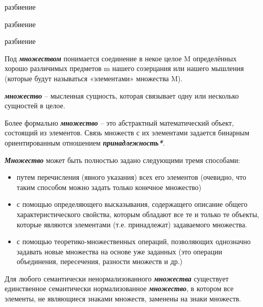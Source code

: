 \begin{SCn}
\begin{scnrelfromset}{разбиение}
\end{scnrelfromset}

\begin{scnrelfromset}{разбиение}
\end{scnrelfromset}

\begin{scnrelfromset}{разбиение}
\end{scnrelfromset}
\end{SCn}

Под \textbf{\textit{множеством}} понимается соединение в некое целое M определённых хорошо различимых предметов m нашего созерцания или нашего мышления (которые будут называться «элементами» множества M). 
	
\textbf{\textit{множество}} – мысленная сущность, которая связывает одну или несколько сущностей в целое.
	
Более формально \textbf{\textit{множество}} – это абстрактный математический объект, состоящий из элементов. Связь множеств с их элементами задается бинарным ориентированным отношением \textbf{\textit{принадлежность*}}.

\textbf{\textit{Множество}} может быть полностью задано следующими тремя способами:

\begin{itemize}
		\item путем перечисления (явного указания) всех его элементов (очевидно, что таким способом можно задать только конечное множество)
		\item с помощью определяющего высказывания, содержащего описание общего характеристического свойства, которым обладают все те и только те объекты, которые являются элементами (т.е. принадлежат) задаваемого множества.
		\item с помощью теоретико-множественных операций, позволяющих однозначно задавать новые множества на основе уже заданных (это операции объединения, пересечения, разности множеств и др.)
\end{itemize}

Для любого семантически ненормализованного \textbf{\textit{множества}} существует единственное семантически нормализованное \textbf{\textit{множество}}, в котором все элементы, не являющиеся знаками множеств, заменены на знаки множеств.

